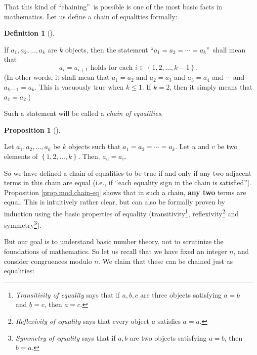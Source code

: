 \documentclass[numbers=enddot,12pt,final,onecolumn,notitlepage]{scrartcl}%
\numberwithin{exer}{subsection}
\theoremstyle{definition}
\newtheorem{prop}[theo]{Proposition}
\newenvironment{proposition}[1][]
{\begin{prop}[#1]\begin{leftbar}}
{\end{leftbar}\end{prop}}
\newtheorem{defi}[theo]{Definition}
\newenvironment{definition}[1][]
{\begin{defi}[#1]\begin{leftbar}}
{\end{leftbar}\end{defi}}
\begin{document}
That this kind of \textquotedblleft chaining\textquotedblright\ is possible is
one of the most basic facts in mathematics. Let us define a chain of
equalities formally:

\begin{definition}
If $a_{1},a_{2},\ldots,a_{k}$ are $k$ objects\footnotemark, then the statement
\textquotedblleft$a_{1}=a_{2}=\cdots=a_{k}$\textquotedblright\ shall mean
that
\[
a_{i}=a_{i+1}\text{ holds for each }i\in\left\{  1,2,\ldots,k-1\right\}  .
\]
(In other words, it shall mean that $a_{1}=a_{2}$ and $a_{2}=a_{3}$ and
$a_{3}=a_{4}$ and $\cdots$ and $a_{k-1}=a_{k}$. This is vacuously true when
$k\leq1$. If $k=2$, then it simply means that $a_{1}=a_{2}$.)

Such a statement will be called a \textit{chain of equalities}.
\end{definition}


\begin{proposition}
\label{prop.mod.chain-eq}Let $a_{1},a_{2},\ldots,a_{k}$ be $k$ objects such
that $a_{1}=a_{2}=\cdots=a_{k}$. Let $u$ and $v$ be two elements of $\left\{
1,2,\ldots,k\right\}  $. Then, $a_{u}=a_{v}$.
\end{proposition}

So we have defined a chain of equalities to be true if and only if any two
adjacent terms in this chain are equal (i.e., if \textquotedblleft each
equality sign in the chain is satisfied\textquotedblright). Proposition
\ref{prop.mod.chain-eq} shows that in such a chain, \textbf{any two} terms are
equal. This is intuitively rather clear, but can also be formally proven by
induction using the basic properties of equality
(transitivity\footnote{\textit{Transitivity of equality} says that if $a,b,c$
are three objects satisfying $a=b$ and $b=c$, then $a=c$.},
reflexivity\footnote{\textit{Reflexivity of equality} says that every object
$a$ satisfies $a=a$.} and symmetry\footnote{\textit{Symmetry of equality} says
that if $a,b$ are two objects satisfying $a=b$, then $b=a$.}).

But our goal is to understand basic number theory, not to scrutinize the
foundations of mathematics. So let us recall that we have fixed an integer
$n$, and consider congruences modulo $n$. We claim that these can be chained
just as equalities:
\end{document}
